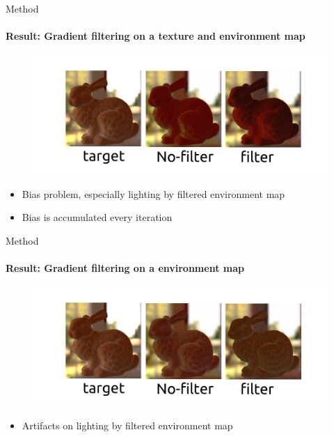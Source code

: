 \documentclass[beamer]{standalone}
\begin{document}
\begin{frame}{Method}
    \framesubtitle{Result: Gradient filtering on a texture and environment map}
        \begin{figure}[t]
            \includegraphics[width=\linewidth]{./figures/result-3.png}
        \centering
        \end{figure}
        \begin{itemize}    
            \item Bias problem, especially lighting by filtered environment map
            \item Bias is accumulated every iteration
        \end{itemize}
    
    \note[item] {
    }
\end{frame}

\begin{frame}{Method}
    \framesubtitle{Result: Gradient filtering on a environment map}
        \begin{figure}[t]
            \includegraphics[width=\linewidth]{./figures/result-4.png}
        \centering
        \end{figure}
        \begin{itemize}
            \item Artifacts on lighting by filtered environment map
        \end{itemize}
    \note[item] {
    }
\end{frame}
\end{document}
